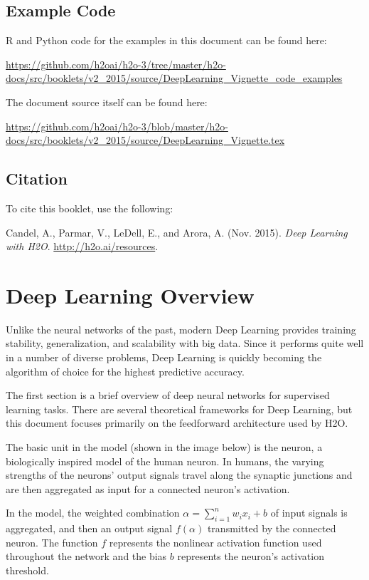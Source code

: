 




\subsection{Example Code}

R and Python code for the examples in this document can be found here:

\url{https://github.com/h2oai/h2o-3/tree/master/h2o-docs/src/booklets/v2_2015/source/DeepLearning_Vignette_code_examples}

The document source itself can be found here:

\url{https://github.com/h2oai/h2o-3/blob/master/h2o-docs/src/booklets/v2_2015/source/DeepLearning_Vignette.tex}
\newpage
\subsection{Citation}

To cite this booklet, use the following: 

Candel, A., Parmar, V., LeDell, E.,  and Arora, A. (Nov. 2015). {\textit{Deep Learning with H2O}}. {\url{http://h2o.ai/resources}}. 

\section{Deep Learning Overview}
Unlike the neural networks of the past, modern Deep Learning  provides training stability, generalization, and scalability with big data. Since it performs quite well in a number of diverse problems, Deep Learning is quickly becoming the algorithm of choice for the highest predictive accuracy. 

The first section is a brief overview of deep neural networks for supervised learning tasks. There are several theoretical frameworks for Deep Learning, but this document focuses primarily on the feedforward architecture used by H2O. 

The basic unit in the model (shown in the image below) is the neuron, a biologically inspired model of the human neuron. In humans, the varying strengths of the neurons' output signals travel along the synaptic junctions and are then aggregated  as input for a connected neuron's activation. 

In the model, the weighted combination $\alpha = \sum_{i=1}^{n} w_i x_i + b$ of input signals is aggregated, and then an output signal $f(\alpha)$ transmitted by the connected neuron. The function $f$ represents the nonlinear activation function used throughout the network and the bias $b$ represents the neuron's activation threshold.

